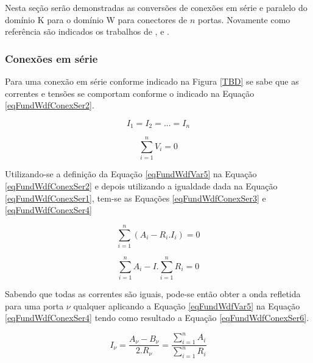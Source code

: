 	Nesta seção serão demonstradas as conversões de conexões em série e paralelo do domínio K para o domínio W para conectores de $n$ portas. Novamente como referência são indicados os trabalhos de ,  e   .
	
		\subsubsection{Conexões em série}
		
	Para uma conexão em série conforme indicado na Figura \ref{TBD} se sabe que as correntes e tensões se comportam conforme o indicado na Equação \ref{eqFundWdfConexSer2}.
	
	\begin{equation}
		\label{eqFundWdfConexSer1}
		I_1 = I_2 = ... = I_n
	\end{equation}
	
	\begin{equation}
		\label{eqFundWdfConexSer2}
		\sum_{i=1}^{n} V_i = 0
	\end{equation}
	
	Utilizando-se a definição da Equação \ref{eqFundWdfVar5} na Equação \ref{eqFundWdfConexSer2} e depois utilizando a igualdade dada na Equação \ref{eqFundWdfConexSer1}, tem-se as Equações \ref{eqFundWdfConexSer3} e \ref{eqFundWdfConexSer4}
	
	\begin{equation}
		\label{eqFundWdfConexSer3}
		\sum_{i=1}^{n} (A_i-R_i.I_i) = 0
	\end{equation}
	
	\begin{equation}
		\label{eqFundWdfConexSer4}
		\sum_{i=1}^{n} A_i - I. \sum_{i=1}^{n} R_i = 0
	\end{equation}
	
	Sabendo que todas as correntes são iguais, pode-se então obter a onda refletida para uma porta $\nu$ qualquer aplicando a Equação \ref{eqFundWdfVar5} na Equação \ref{eqFundWdfConexSer4} tendo como resultado a Equação \ref{eqFundWdfConexSer6}.
	
	\begin{equation}
		\label{eqFundWdfConexSer5}
		I_{\nu} = \frac{A_{\nu} - B_{\nu}}{2.R_{\nu}} = \frac{\sum_{i=1}^{n} A_i}{\sum_{i=1}^{n} R_i}
	\end{equation}
	
